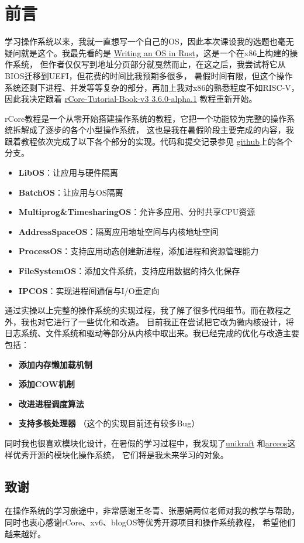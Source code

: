 \chapter*{前言}

学习操作系统以来，我就一直想写一个自己的OS，因此本次课设我的选题也毫无疑问就是这个。我最先看的是
\href{https://os.phil-opp.com/}{Writing an OS in Rust}，这是一个在x86上构建的操作系统，
但作者仅仅写到地址分页部分就戛然而止，在这之后，我尝试将它从BIOS迁移到UEFI，但花费的时间比我预期多很多，
暑假时间有限，但这个操作系统还剩下进程、并发等等复杂的部分，再加上我对x86的熟悉程度不如RISC-V，因此我决定跟着
\href{https://rcore-os.cn/rCore-Tutorial-Book-v3/index.html}{rCore-Tutorial-Book-v3 3.6.0-alpha.1}
教程重新开始。

rCore教程是一个从零开始搭建操作系统的教程，它把一个功能较为完整的操作系统拆解成了逐步的各个小型操作系统，
这也是我在暑假阶段主要完成的内容，我跟着教程依次完成了以下各个部分的实现。代码和提交记录参见
\href{https://github.com/Tinuvile/NimlothOS}{github}上的各个分支。

\begin{itemize}
    \item \textbf{LibOS}：让应用与硬件隔离
    \item \textbf{BatchOS}：让应用与OS隔离
    \item \textbf{Multiprog\&TimesharingOS}：允许多应用、分时共享CPU资源
    \item \textbf{AddressSpaceOS}：隔离应用地址空间与内核地址空间
    \item \textbf{ProcessOS}：支持应用动态创建新进程，添加进程和资源管理能力
    \item \textbf{FileSystemOS}：添加文件系统，支持应用数据的持久化保存
    \item \textbf{IPCOS}：实现进程间通信与I/O重定向
\end{itemize}

通过实操以上完整的操作系统的实现过程，我了解了很多代码细节。而在教程之外，我也对它进行了一些优化和改造。
目前我正在尝试把它改为微内核设计，将日志系统、文件系统和驱动等部分从内核中取出来。我已经完成的优化与改造主要包括：

\begin{itemize}
    \item \textbf{添加内存懒加载机制}
    \item \textbf{添加COW机制}
    \item \textbf{改进进程调度算法}
    \item \textbf{支持多核处理器} （这个的实现目前还有较多Bug）
\end{itemize}

同时我也很喜欢模块化设计，在暑假的学习过程中，我发现了\href{https://github.com/unikraft/unikraft}{unikraft}
和\href{https://github.com/arceos-org/arceos}{arceos}这样优秀开源的模块化操作系统，
它们将是我未来学习的对象。

\section*{致谢}

在操作系统的学习旅途中，非常感谢王冬青、张惠娟两位老师对我的教学与帮助，同时也衷心感谢rCore、xv6、blogOS等优秀开源项目和操作系统教程，
希望他们越来越好。